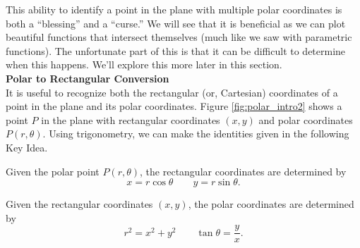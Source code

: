This ability to identify a point in the plane with multiple polar coordinates is both a ``blessing'' and a ``curse.'' We will see that it is beneficial as we can plot beautiful functions that intersect themselves (much like we saw with parametric functions). The unfortunate part of this is that it can be difficult to determine when this happens. We'll explore this more later in this section.\\

\noindent\textbf{\large Polar to Rectangular Conversion}\\

It is useful to recognize both the rectangular (or, Cartesian) coordinates of a point in the plane and its polar coordinates. Figure \ref{fig:polar_intro2} shows a point $P$ in the plane with rectangular coordinates $(x,y)$ and polar coordinates $P(r,\theta)$. Using trigonometry, we can make the identities given in the following Key Idea.

{Given the polar point $P(r,\theta)$, the rectangular coordinates are determined by $$x=r\cos \theta\qquad y=r\sin \theta.$$

Given the rectangular coordinates $(x,y)$, the polar coordinates are determined by
$$ r^2=x^2+y^2\qquad \tan \theta = \frac yx.$$
}


